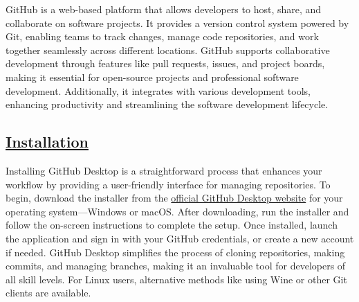 \documentclass{article}
\begin{document}
\large{GitHub is a web-based platform that allows developers to host, share, and collaborate on software projects. It provides a version control system powered by Git, enabling teams to track changes, manage code repositories, and work together seamlessly across different locations. GitHub supports collaborative development through features like pull requests, issues, and project boards, making it essential for open-source projects and professional software development. Additionally, it integrates with various development tools, enhancing productivity and streamlining the software development lifecycle.}
\vspace{1 cm}
\begin{center}
    \section*{\textbf{\underline{Installation}}}
\end{center}

\large{Installing GitHub Desktop is a straightforward process that enhances your workflow by providing a user-friendly interface for managing repositories. To begin, download the installer from the \href{https://desktop.github.com/}{official GitHub Desktop website} for your operating system—Windows or macOS. After downloading, run the installer and follow the on-screen instructions to complete the setup. Once installed, launch the application and sign in with your GitHub credentials, or create a new account if needed. GitHub Desktop simplifies the process of cloning repositories, making commits, and managing branches, making it an invaluable tool for developers of all skill levels. For Linux users, alternative methods like using Wine or other Git clients are available.}
\end{document}
